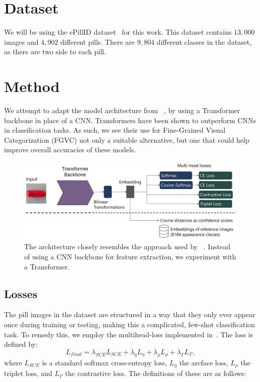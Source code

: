\documentclass[10pt,twocolumn,letterpaper]{article}
\begin{document}
\section{Dataset}
We will be using the ePillID dataset~\cite{ePill} for this work.  This dataset contains $13,000$ images and $4,902$ different pills.  There are $9,804$ different classes in the dataset, as there are two side to each pill.

\section{Method}
We attempt to adapt the model architecture from ~\cite{ePill}, by using a Transformer backbone in place of a CNN. 
Transformers have been shown to outperform CNNs in classification tasks. As such, we see their use for Fine-Grained Visual Categorization (FGVC) not only a suitable alternative, but one that could help improve overall accuracies of these models.

\begin{figure}[h]
    \centering
    \includegraphics[width=.5\textwidth]{transformer-head.png}
    \caption{The architecture closely resembles the approach used by ~\cite{repo}. Instead of using a CNN backbone for feature extraction, we experiment with a Transformer.}
    \label{fig:t_head}
\end{figure}

\subsection{Losses}
The pill images in the dataset are structured in a way that they only ever appear once during training or testing, making this a complicated, few-shot classification task. To remedy this, we employ the multihead-loss implemented in~\cite{ePill}.  The loss is defined by:
\begin{equation}
L_{final} = \lambda_{SCE}L_{SCE} + \lambda_\eta L_\eta + \lambda_\rho L_\rho + \lambda_\Gamma L_\Gamma,
\end{equation}
where $L_{SCE}$ is a standard softmax cross-entropy loss, $L_\eta$ the arcface loss, $L_\rho$ the triplet loss, and $L_\Gamma$ the contrastive loss. The definitions of these are as follows:
\end{document}
